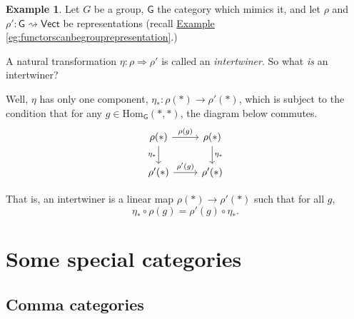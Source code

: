 \documentclass[a4paper]{report}
\newcommand{\Hom}{\mathrm{Hom}}
\theoremstyle{definition}
\newtheorem{example}{Example}[section]
\theoremstyle{plain}
\theoremstyle{remark}
\begin{document}
\begin{example}
  \label{eg:intertwinersarenaturaltransformations}
  Let $G$ be a group, $\mathsf{G}$ the category which mimics it, and let $\rho$ and $\rho'\colon \mathsf{G} \rightsquigarrow \mathsf{Vect}$ be representations (recall \hyperref[eg:functorscanbegrouprepresentation]{Example \ref*{eg:functorscanbegrouprepresentation}}.)

  A natural transformation $\eta\colon \rho \Rightarrow \rho'$ is called an \emph{intertwiner}. So what \emph{is} an intertwiner?

  Well, $\eta$ has only one component, $\eta_{*}\colon \rho(*) \to \rho'(*)$, which is subject to the condition that for any $g \in \Hom_{\mathsf{G}}(*,*)$, the diagram below commutes.
  \begin{equation*}
    \begin{tikzcd}
      \rho(*)
      \arrow[r, "\rho(g)"]
      \arrow[d, swap, "\eta_{*}"]
      & \rho(*)
      \arrow[d, "\eta_{*}"]
      \\
      \rho'(*)
      \arrow[r, "\rho'(g)"]
      & \rho'(*)
    \end{tikzcd}
  \end{equation*}

  That is, an intertwiner is a linear map $\rho(*) \to \rho'(*)$ such that for all $g$,
  \begin{equation*}
    \eta_{*} \circ \rho(g) = \rho'(g) \circ \eta_{*}.
  \end{equation*}
\end{example}

\section{Some special categories} \label{sec:specialcategories}
\subsection{Comma categories}
\end{document}
